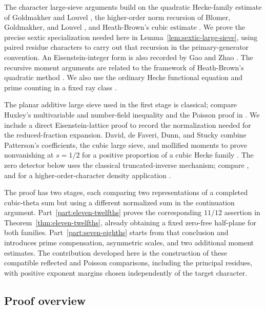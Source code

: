 \documentclass[11pt,a4paper]{article}
\numberwithin{equation}{section}
\numberwithin{figure}{section}
\theoremstyle{definition}
\theoremstyle{remark}
\begin{document}
The character large-sieve arguments build on the quadratic Hecke-family
estimate of Goldmakher and Louvel \cite[Definition 1 and Theorem 1.1]{GL},
the higher-order norm recursion of Blomer, Goldmakher, and Louvel
\cite[Theorem 1.3 and Section 3]{BGL}, and Heath-Brown's cubic estimate
\cite[Theorem 2]{HB}. We prove the precise sextic specialization needed
here in Lemma~\ref{lem:sextic-large-sieve}, using paired residue characters
to carry out that recursion in the primary-generator convention. An
Eisenstein-integer form is also recorded by Gao and Zhao
\cite[Lemma 2.9]{GZSextic}. The recursive
moment arguments are related to the framework of Heath-Brown's quadratic
method \cite[Section 2]{HBQuadratic}. We also use the ordinary Hecke
functional equation \cite[Equation (1.1)]{GZ} and prime counting in a
fixed ray class \cite[Theorem 1.1]{TZ}.

The planar additive large sieve used in the first stage is classical;
compare Huxley's multivariable and number-field inequality \cite{Huxley}
and the Poisson proof in \cite[Section 3, Theorem 3]{BaierBansal}.
We include a direct Eisenstein-lattice proof to record the normalization
needed for the reduced-fraction expansion. David, de Faveri, Dunn, and
Stucky combine Patterson's coefficients, the cubic large sieve, and
mollified moments to prove nonvanishing at $s=1/2$ for a positive
proportion of a cubic Hecke family
\cite[Theorem 1.1 and Section 1.2]{DFDS}. The zero detector below uses
the classical truncated-inverse mechanism; compare
\cite[Appendix C]{MP}, and for a higher-order-character
density application \cite[Corollary 1.6 and Section 5]{BGL}.

The proof has two stages, each comparing two representations of a
completed cubic-theta sum but using a different normalized sum in the
continuation argument. Part~\ref{part:eleven-twelfths} proves the corresponding
$11/12$ assertion in Theorem~\ref{thm:eleven-twelfths}, already obtaining a
fixed zero-free half-plane for both families.
Part~\ref{part:seven-eighths} starts from that conclusion and introduces
prime compensation, asymmetric scales, and two additional moment estimates.
The contribution developed here is the construction of these compatible
reflected and Poisson comparisons, including the principal residues, with
positive exponent margins chosen independently of the target character.

\subsection*{Proof overview}
\end{document}
